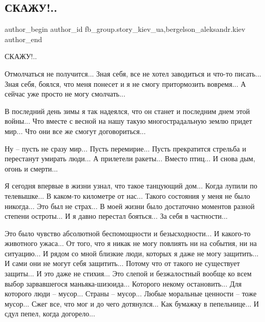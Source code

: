  
 
 
 
 
 
\subsection{СКАЖУ!..}
\label{sec:02_02_2022.fb.fb_group.story_kiev_ua.1.skazhu}
 
\ifcmt
 author_begin
   author_id fb_group.story_kiev_ua,bergelson_aleksandr.kiev
 author_end
\fi

СКАЖУ!..

Отмолчаться не получится... Зная себя, все не хотел заводиться и что-то
писать... Зная себя, боялся, что меня понесет и я не смогу притормозить
вовремя... А сейчас уже просто не могу смолчать... 

В последний день зимы я так надеялся, что он станет и последним днем этой
войны... Что вместе  с весной на нашу такую многострадальную землю придет мир...
Что они все же смогут договориться... 

Ну – пусть не сразу мир... Пусть перемирие... Пусть прекратится стрельба и
перестанут умирать люди... А прилетели ракеты... Вместо птиц... И снова дым, огонь
и смерти... 

Я сегодня впервые в жизни узнал, что такое танцующий дом... Когда лупили по
телевышке... В каком-то километре от нас... Такого состояния у меня не было
никогда... Это был не страх... В моей жизни было достаточно моментов разной
степени остроты... И я давно перестал бояться... За себя в частности... 

Это было чувство абсолютной беспомощности и безысходности... И какого-то
животного ужаса... От того, что я никак не могу повлиять ни на события, ни на
ситуацию... И рядом со мной близкие люди, которых я даже не могу защитить... И
сами они не могут себя защитить... Потому что от такого не существует защиты...
И это даже не стихия... Это слепой и безжалостный вообще ко всем выбор
зарвавшегося маньяка-шизоида... Которого некому остановить... Для которого люди
– мусор... Страны – мусор... Любые моральные ценности – тоже мусор... Сжег все,
что мог и до чего дотянулся... Как бумажку в пепельнице... И сдул пепел, когда
догорело... 

